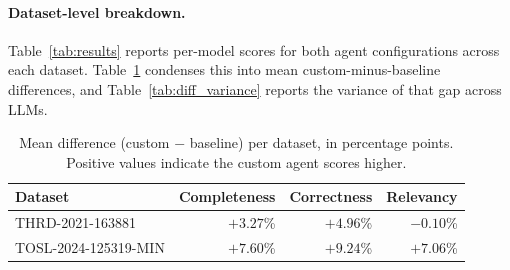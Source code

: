 \paragraph{Dataset-level breakdown.}
Table~\ref{tab:results} reports per-model scores for both agent configurations across
each dataset. Table~\ref{tab:diff_results_pct} condenses this into mean custom-minus-baseline
differences, and Table~\ref{tab:diff_variance} reports the variance of that gap across LLMs.

\begin{table}[htbp]
\centering
\caption{Mean completeness, correctness, and relevancy by dataset, model, and agent
         configuration (Baseline+RAG vs.\ Custom).}
\label{tab:results}
\end{table}

\begin{table}[htbp]
\centering
\caption{Mean difference (custom $-$ baseline) per dataset, in percentage points.
         Positive values indicate the custom agent scores higher.}
\label{tab:diff_results_pct}
\begin{tabular}{lrrr}
\toprule
\textbf{Dataset} & \textbf{Completeness} & \textbf{Correctness} & \textbf{Relevancy} \\
\midrule
THRD-2021-163881     & $+3.27$\% & $+4.96$\% & $-0.10$\% \\
TOSL-2024-125319-MIN & $+7.60$\% & $+9.24$\% & $+7.06$\% \\
\bottomrule
\end{tabular}
\end{table}

